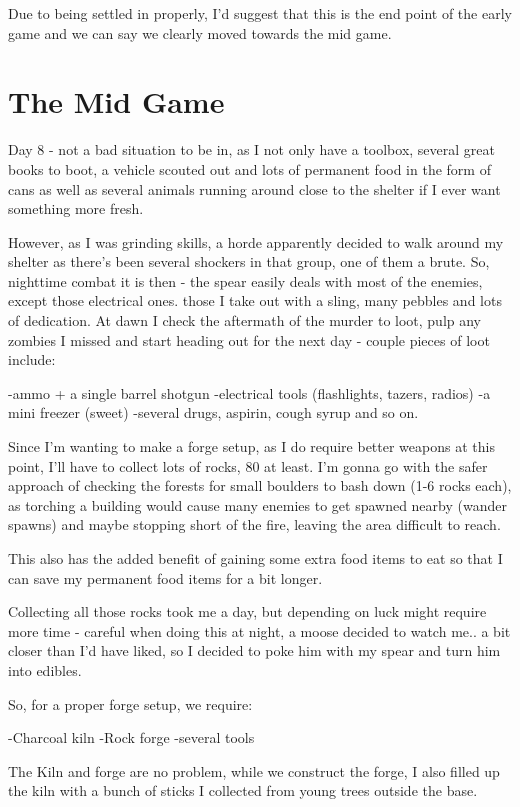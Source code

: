 \documentclass[11pt]{report}
\begin{document}
Due to being settled in properly, I'd suggest that this is the end point of the early game and we can say we clearly moved towards the mid game.

\section{The Mid Game}

Day 8 - not a bad situation to be in, as I not only have a toolbox, several great books to boot, a vehicle scouted out and lots of permanent food in the form of cans as well as several animals running around close to the shelter if I ever want something more fresh.

However, as I was grinding skills, a horde apparently decided to walk around my shelter as there's been several shockers in that group, one of them a brute. So, nighttime combat it is then - the spear easily deals with most of the enemies, except those electrical ones. those I take out with a sling, many pebbles and lots of dedication. At dawn I check the aftermath of the murder to loot, pulp any zombies I missed and start heading out for the next day - couple pieces of loot include:

-ammo + a single barrel shotgun
-electrical tools (flashlights, tazers, radios)
-a mini freezer (sweet)
-several drugs, aspirin, cough syrup and so on.

Since I'm wanting to make a forge setup, as I do require better weapons at this point, I'll have to collect lots of rocks, 80 at least. I'm gonna go with the safer approach of checking the forests for small boulders to bash down (1-6 rocks each), as torching a building would cause many enemies to get spawned nearby (wander spawns) and maybe stopping short of the fire, leaving the area difficult to reach.

This also has the added benefit of gaining some extra food items to eat so that I can save my permanent food items for a bit longer.

Collecting all those rocks took me a day, but depending on luck might require more time - careful when doing this at night, a moose decided to watch me.. a bit closer than I'd have liked, so I decided to poke him with my spear and turn him into edibles.

So, for a proper forge setup, we require:

-Charcoal kiln
-Rock forge
-several tools

The Kiln and forge are no problem, while we construct the forge, I also filled up the kiln with a bunch of sticks I collected from young trees outside the base.
\end{document}

